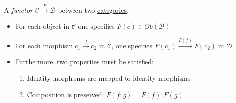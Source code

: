 A \emph{functor} $\mathcal{C}\xrightarrow{F}\mathcal{D}$ between two \hyperref[D3.6]{categories}.

\begin{itemize}
    \item  For each object in $\mathcal{C}$ one specifies $F(c) \in Ob(\mathcal{D})$
    \item For each morphism $c_1\xrightarrow{f}c_2$ in $\mathcal{C}$, one specifies $F(c_1)\xrightarrow{F(f)}F(c_2)$ in $\mathcal{D}$
    \item Furthermore, two properties must be satisfied:
          \begin{enumerate}
            \item Identity morphisms are mapped to identity morphisms
            \item Composition is preserved: $F(f;g)=F(f);F(g)$
          \end{enumerate}
  \end{itemize}
